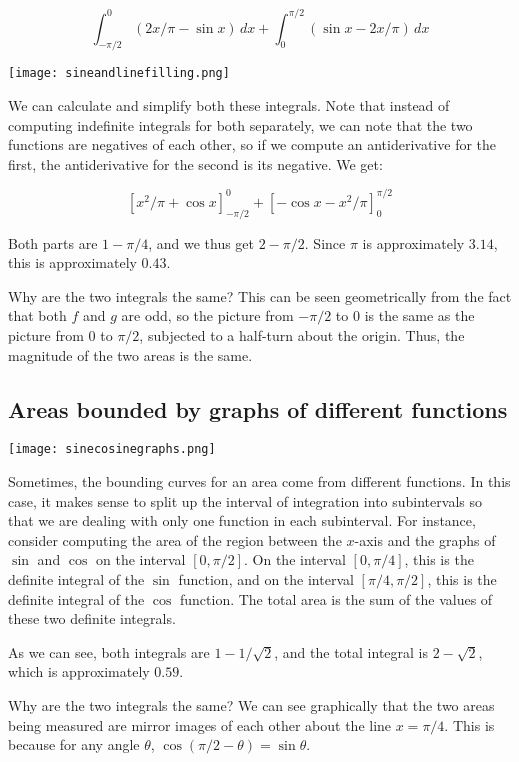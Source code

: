 \documentclass[10pt]{amsart}
\begin{document}
$$\int_{-\pi/2}^0 (2x/\pi - \sin x) \, dx + \int_0^{\pi/2} (\sin x - 2x/\pi) \, dx$$

\texttt{[image: sineandlinefilling.png]}

We can calculate and simplify both these integrals. Note that instead
of computing indefinite integrals for both separately, we can note
that the two functions are negatives of each other, so if we compute
an antiderivative for the first, the antiderivative for the second is
its negative. We get:

$$[x^2/\pi + \cos x]_{-\pi/2}^0 + [-\cos x - x^2/\pi]_0^{\pi/2}$$

Both parts are $1 - \pi/4$, and we thus get $2 - \pi/2$. Since $\pi$
is approximately $3.14$, this is approximately $0.43$.

Why are the two integrals the same? This can be seen geometrically
from the fact that both $f$ and $g$ are odd, so the picture from
$-\pi/2$ to $0$ is the same as the picture from $0$ to $\pi/2$,
subjected to a half-turn about the origin. Thus, the magnitude of the
two areas is the same.

\subsection{Areas bounded by graphs of different functions}

\texttt{[image: sinecosinegraphs.png]}

Sometimes, the bounding curves for an area come from different
functions. In this case, it makes sense to split up the interval of
integration into subintervals so that we are dealing with only one
function in each subinterval. For instance, consider computing the
area of the region between the $x$-axis and the graphs of $\sin$ and
$\cos$ on the interval $[0,\pi/2]$. On the interval $[0,\pi/4]$, this
is the definite integral of the $\sin$ function, and on the interval
$[\pi/4,\pi/2]$, this is the definite integral of the $\cos$
function. The total area is the sum of the values of these two
definite integrals.

As we can see, both integrals are $1 - 1/\sqrt{2}$, and the total
integral is $2 - \sqrt{2}$, which is approximately $0.59$.

Why are the two integrals the same? We can see graphically that the
two areas being measured are mirror images of each other about the
line $x = \pi/4$. This is because for any angle $\theta$, $\cos (\pi/2
- \theta) = \sin \theta$.
\end{document}

